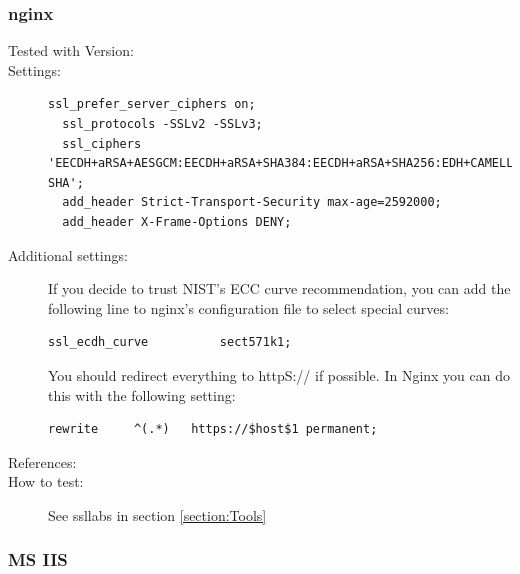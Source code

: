 \subsubsection{nginx}

\begin{description}
\item[Tested with Version:]


\item[Settings:] \mbox{}

\begin{lstlisting}[breaklines]
  ssl_prefer_server_ciphers on;
  ssl_protocols -SSLv2 -SSLv3; 
  ssl_ciphers 'EECDH+aRSA+AESGCM:EECDH+aRSA+SHA384:EECDH+aRSA+SHA256:EDH+CAMELLIA256:EECDH:EDH+aRSA:+SSLv3:!aNULL:!eNULL:!LOW:!3DES:!MD5:!EXP:!PSK:!SRP:!DSS:!RC4:!SEED:!AES128:!CAMELLIA128:!ECDSA:AES256-SHA';
  add_header Strict-Transport-Security max-age=2592000;
  add_header X-Frame-Options DENY;
\end{lstlisting}


\item[Additional settings:]

If you decide to trust NIST's ECC curve recommendation, you can add the following line to nginx's configuration file to select special curves:

\begin{lstlisting}[breaklines]
  ssl_ecdh_curve          sect571k1;
\end{lstlisting}

You should redirect everything to httpS:// if possible. In Nginx you can do this with the following setting:

\begin{lstlisting}[breaklines]
  rewrite     ^(.*)   https://$host$1 permanent;
\end{lstlisting}


\item[References:] 

\item[How to test:] See ssllabs in section \ref{section:Tools}

\end{description}





\subsubsection{MS IIS}
\label{sec:ms-iis}


